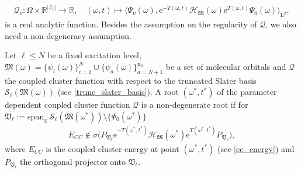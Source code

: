 \documentclass[reqno]{amsart}
\begin{document}
\begin{align}
    \mathcal{Q}_\nu:\Omega\times \mathbb{R}^{|\mathscr{I}_\ell|}\longrightarrow \mathbb{R},\quad (\omega,t)\mapsto \langle \Psi_\nu(\omega),\mathrm{e}^{-T(\omega,t)}\mathcal{H}_\mathfrak{M}(\omega)\mathrm{e}^{T(\omega,t)}\Psi_0(\omega) \rangle_{\mathrm{L}^2},
\end{align}
is a real analytic function. Besides the assumption on the regularity of $\mathcal{Q}$, we also need a non-degeneracy assumption.
\begin{definition}\label{non-degen_defi} Let $\ell\le N$ be a fixed excitation level, $\mathfrak{M}(\omega)= \lbrace \psi_i(\omega)\rbrace_{i=1}^N\cup \lbrace \psi_a(\omega)\rbrace_{a=N+1}^{\mathrm{n}_\mathrm{b}}$ be a set of molecular orbitals and $\mathcal{Q}$ the coupled cluster function with respect to the truncated Slater basis $\mathcal{S}_\ell(\mathfrak{M}(\omega))$ (see \eqref{trunc_slater_basis}). 
    A root $(\omega^*, t^*)$ of the parameter dependent coupled cluster function $\mathcal{Q}$ is a non-degenerate root if for $\mathfrak{V}_\ell:=\mathrm{span}_{\mathbb{C}}\,\mathcal{S}_\ell(\mathfrak{M}(\omega^*))\setminus  \lbrace \Psi_0(\omega^*) \rbrace$ 
    \begin{align}\label{non-degen-assum}
        E_{CC} \notin \sigma\big(P_{\mathfrak{V}_\ell}\mathrm{e}^{-T(\omega^*,t^*)}\mathcal{H}_{\mathfrak{M}}(\omega^*)\mathrm{e}^{T(\omega^*,t^*)}P_{\mathfrak{V}_\ell}\big),
    \end{align}
  where $E_{CC}$ is the coupled cluster energy at point $(\omega^*,t^*)$ (see \eqref{cc_energy}) and $P_{\mathfrak{V}_\ell}$ the orthogonal projector onto $\mathfrak{V}_\ell$.
\end{definition}
\end{document}
